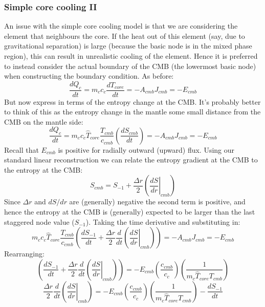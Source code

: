 \subsubsection{Simple core cooling II}
An issue with the simple core cooling model is that we are considering the element that neighbours the core.  If the heat out of this element (say, due to gravitational separation) is large (because the basic node is in the mixed phase region), this can result in unrealistic cooling of the element.  Hence it is preferred to instead consider the actual boundary of the CMB (the lowermost basic node) when constructing the boundary condition.  As before:
\begin{equation}
\frac{dQ_c}{dt} = m_c c_c \frac{dT_{core}}{dt} = -A_{cmb} J_{cmb} = -E_{cmb}
\label{eq:core_energy_balanceII}
\end{equation}
But now express in terms of the entropy change at the CMB.  It's probably better to think of this as the entropy change in the mantle some small distance from the CMB on the mantle side:
\begin{equation}
\frac{dQ_c}{dt} = m_c c_c \hat{T}_{core} \frac{T_{cmb}}{c_{cmb}} \left( \frac{dS_{cmb}}{dt} \right) = -A_{cmb} J_{cmb} = -E_{cmb}
\end{equation}
Recall that $E_{cmb}$ is positive for radially outward (upward) flux.  Using our standard linear reconstruction we can relate the entropy gradient at the CMB to the entropy at the CMB:
\begin{equation}
S_{cmb} = S_{-1} + \frac{\Delta r}{2} \left( \left. \frac{dS}{dr} \right |_{cmb} \right)
\end{equation}
Since $\Delta r$ and $dS/dr$ are (generally) negative the second term is positive, and hence the entropy at the CMB is (generally) expected to be larger than the last staggered node value ($S_{-1}$).  Taking the time derivative and substituting in:
\begin{equation}
m_c c_c \hat{T}_{core} \frac{T_{cmb}}{c_{cmb}} \left( \frac{dS_{-1}}{dt} + \frac{\Delta r}{2} \frac{d}{dt} \left( \left. \frac{dS}{dr} \right |_{cmb} \right)  \right) = -A_{cmb} J_{cmb} = -E_{cmb}
\end{equation}
Rearranging:
\begin{equation}
\left( \frac{dS_{-1}}{dt} + \frac{\Delta r}{2} \frac{d}{dt} \left( \left. \frac{dS}{dr} \right |_{cmb} \right)  \right) = -E_{cmb} \left( \frac{c_{cmb}}{c_c} \right) \left( \frac{1}{m_c \hat{T}_{core} T_{cmb}} \right)
\end{equation}
\begin{equation}
\frac{\Delta r}{2} \frac{d}{dt} \left( \left. \frac{dS}{dr} \right |_{cmb} \right) = -E_{cmb} \left( \frac{c_{cmb}}{c_c} \right) \left( \frac{1}{m_c \hat{T}_{core} T_{cmb}} \right) - \frac{dS_{-1}}{dt}
\end{equation}

